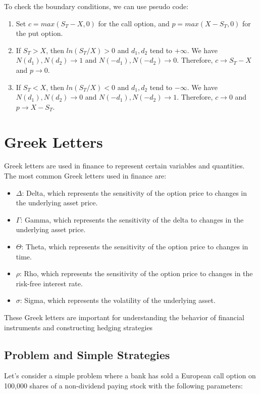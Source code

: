 \documentclass{article}
\theoremstyle{mytheoremstyle}
\theoremstyle{mytheoremstyle}
\theoremstyle{myproblemstyle}
\begin{document}
To check the boundary conditions, we can use pseudo code:

\begin{enumerate}
\item Set $c = max(S_T - X, 0)$ for the call option, and $p = max(X - S_T, 0)$ for the put option.
\item If $S_T > X$, then $ln(S_T/X) > 0$ and $d_1, d_2$ tend to $+\infty$. We have $N(d_1), N(d_2) \to 1$ and $N(-d_1), N(-d_2) \to 0$. Therefore, $c \to S_T - X$ and $p \to 0$.
\item If $S_T < X$, then $ln(S_T/X) < 0$ and $d_1, d_2$ tend to $-\infty$. We have $N(d_1), N(d_2) \to 0$ and $N(-d_1), N(-d_2) \to 1$. Therefore, $c \to 0$ and $p \to X - S_T$.
\end{enumerate}

\section{Greek Letters}

Greek letters are used in finance to represent certain variables and quantities. The most common Greek letters used in finance are:

\begin{itemize}
\item $\Delta$: Delta, which represents the sensitivity of the option price to changes in the underlying asset price.
\item $\Gamma$: Gamma, which represents the sensitivity of the delta to changes in the underlying asset price.
\item $\Theta$: Theta, which represents the sensitivity of the option price to changes in time.
\item $\rho$: Rho, which represents the sensitivity of the option price to changes in the risk-free interest rate.
\item $\sigma$: Sigma, which represents the volatility of the underlying asset.
\end{itemize}

These Greek letters are important for understanding the behavior of financial instruments and constructing hedging strategies
\subsection{Problem and Simple Strategies}

Let's consider a simple problem where a bank has sold a European call option on 100,000 shares of a non-dividend paying stock with the following parameters:
\end{document}
